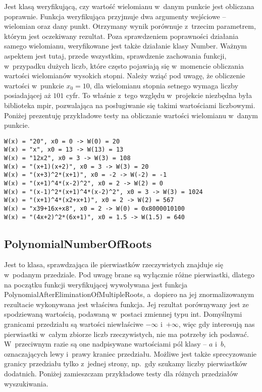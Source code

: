 Jest klasą weryfikującą, czy wartość wielomianu w~danym punkcie jest obliczana poprawnie. Funkcja weryfikująca przyjmuje dwa argumenty wejściowe – wielomian oraz dany punkt. Otrzymany wynik porównuje z~trzecim parametrem, którym jest oczekiwany rezultat. Poza sprawdzeniem poprawności działania samego wielomianu, weryfikowane jest także działanie klasy Number. Ważnym aspektem jest tutaj, przede wszystkim, sprawdzenie zachowania funkcji, w~przypadku dużych liczb, które często pojawiają się w~momencie obliczania wartości wielomianów wysokich stopni. Należy wziąć pod uwagę, że obliczenie wartości w~punkcie $x_0=10$, dla wielomianu stopnia setnego wymaga liczby posiadającej aż $101$ cyfr. To właśnie z~tego względu w~projekcie niezbędna była biblioteka mpir, pozwalająca na posługiwanie się takimi wartościami liczbowymi. Poniżej prezentuję przykładowe testy na obliczanie wartości wielomianu w~danym punkcie.

\begin{lstlisting}
W(x) = "20", x0 = 0 -> W(0) = 20
W(x) = "x", x0 = 13 -> W(13) = 13
W(x) = "12x2", x0 = 3 -> W(3) = 108
W(x) = "(x+1)(x+2)", x0 = 3 -> W(3) = 20
W(x) = "(x+3)^2*(x+1)", x0 = -2 -> W(-2) = -1
W(x) = "(x+1)^4*(x-2)^2", x0 = 2 -> W(2) = 0
W(x) = "(x-1)^2*(x+1)^4*(x-2)^2", x0 = 3 -> W(3) = 1024
W(x) = "(x+1)^4*(x2+x+1)", x0 = 2 -> W(2) = 567
W(x) = "x39+16x+x8", x0 = 2 -> W(0) = 0x8000010100
W(x) = "(4x+2)^2*(6x+1)", x0 = 1.5 -> W(1.5) = 640
\end{lstlisting}

\subsection{PolynomialNumberOfRoots}

Jest to klasa, sprawdzająca ile pierwiastków rzeczywistych znajduje się w~podanym przedziale. Pod uwagę brane są wyłącznie różne pierwiastki, dlatego na początku funkcji weryfikującej wywoływana jest funkcja PolynomialAfterEliminationOfMultipleRoots, a~dopiero na jej znormalizowanym rezultacie wykonywana jest właściwa funkcja. Jej rezultat porównywany jest ze spodziewaną wartością, podawaną w~postaci zmiennej typu int. Domyślnymi granicami przedziału są wartości niewłaściwe $-\infty$ i~$+\infty$, więc gdy interesują nas pierwiastki w~całym zbiorze liczb rzeczywistych, nie ma potrzeby ich podawać. W~przeciwnym razie są one nadpisywane wartościami pól klasy – $a$ i~$b$, oznaczających lewy i~prawy kraniec przedziału. Możliwe jest także sprecyzowanie granicy przedziału tylko z~jednej strony, np.\ gdy szukamy liczby pierwiastków dodatnich. Poniżej zamieszczam przykładowe testy dla różnych przedziałów wyszukiwania.


